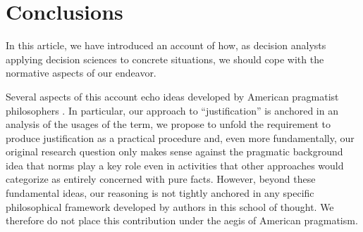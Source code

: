 \documentclass[preprint, french, english, 11pt, authoryear]{elsarticle}%
\begin{document}
\section{Conclusions}
\label{sec:concl}
In this article, we have introduced an account of how, as decision analysts applying decision sciences to concrete situations, we should cope with the normative aspects of our endeavor. %
\begin{changebar}Several aspects of this account echo ideas developed by American pragmatist philosophers \citep{ormerod_history_2006}. 
In particular, our approach to ``justification'' is anchored in an analysis of the usages of the term, we propose to unfold the requirement to produce justification as a practical procedure and, even more fundamentally, 
our original research question only makes sense against the pragmatic background idea that norms play a key role even in activities that other approaches would categorize as entirely concerned with pure facts.
However, beyond these fundamental ideas, our reasoning is not tightly anchored in any specific philosophical framework developed by authors in this school of thought.
We therefore do not place this contribution under the aegis of American pragmatism.
\end{changebar}

\end{document}
